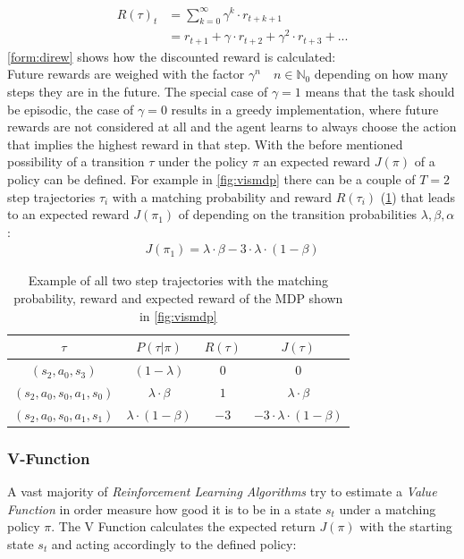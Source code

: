 \begin{align} \label{form:direw}
	R(\tau)_t &= \sum_{k=0}^{\infty} \gamma^k \cdot r_{t+k+1} \\
	&= r_{t+1} + \gamma \cdot r_{t+2} + \gamma^2 \cdot r_{t+3} + ... 
\end{align}
\newline
\cref{form:direw} shows how the discounted reward is calculated:\\
Future rewards are weighed with the factor $\gamma^n \quad n \in \mathbb{N}_0$ depending on how many steps they are in the future. 
The special case of $\gamma = 1$ means that the task should be episodic, the case of $\gamma = 0$ results in a greedy implementation, 
where future rewards are not considered at all and the agent learns to always choose the action that implies the highest reward in that step.
With the before mentioned possibility of a transition $\tau$ under the policy $\pi$ an expected reward $J(\pi)$ of a policy can be defined. 
For example in \cref{fig:vismdp} there can be a couple of $T=2$ step trajectories $\tau_i$ with a matching probability and reward $R(\tau_i)$ (\cref{tab:ex}) 
that leads to an expected reward $J(\pi_1)$ of depending on the transition probabilities $\lambda, \beta, \alpha$:
\begin{align*}
	J(\pi_1) = \lambda \cdot \beta - 3 \cdot \lambda \cdot (1-\beta)
\end{align*}
\begin{table}
	\centering
	\caption{Example of all two step trajectories with the matching probability, reward and expected reward of the MDP shown in \cref{fig:vismdp}}\label{tab:ex}
	\begin{tabular}{c|c|c|c}
		$\tau$ & $P(\tau|\pi)$ & $R(\tau)$ & $J(\tau)$\\
		\hline
		$(s_2,a_0,s_3)$ & $(1-\lambda) $ & $0$ & $0$\\
		$(s_2,a_0,s_0,a_1, s_0)$ & $ \lambda \cdot \beta$ & $1$  & $\lambda \cdot \beta$\\
		$(s_2,a_0,s_0,a_1, s_1)$ & $\lambda \cdot (1-\beta)$ & $-3$ & $-3 \cdot \lambda \cdot (1 - \beta)$\\
	\end{tabular}
\end{table}

\newpage

\subsubsection{V-Function} \label{sec:V}
A vast majority of \emph{Reinforcement Learning Algorithms} try to estimate a \emph{Value Function} in order measure how good it is 
to be in a state $s_t$ under a matching policy $\pi$. 
The V Function calculates the expected return $J(\pi)$ with the starting state $s_t$ and acting accordingly to the defined policy:

